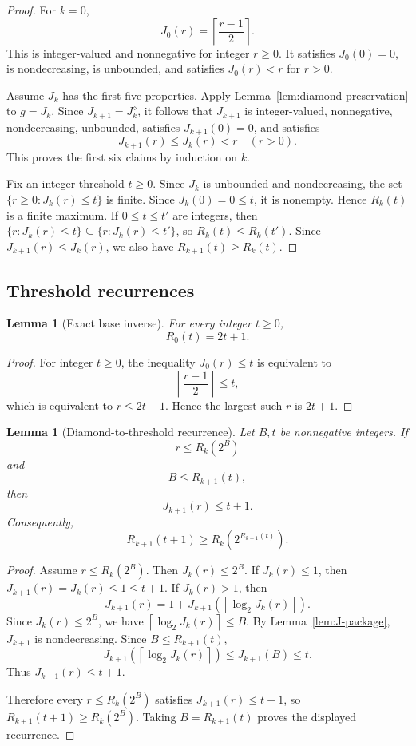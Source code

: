 ﻿\documentclass[11pt]{article}
\newtheorem{lemma}[theorem]{Lemma}
\newcommand{\ceil}[1]{\left\lceil #1 \right\rceil}
\begin{document}
\begin{proof}
For $k=0$,
\[
J_0(r)=\ceil{\frac{r-1}{2}}.
\]
This is integer-valued and nonnegative for integer $r\ge0$.  It satisfies $J_0(0)=0$, is nondecreasing, is unbounded, and satisfies $J_0(r)<r$ for $r>0$.

Assume $J_k$ has the first five properties.  Apply Lemma~\ref{lem:diamond-preservation} to $g=J_k$.  Since $J_{k+1}=J_k^\diamond$, it follows that $J_{k+1}$ is integer-valued, nonnegative, nondecreasing, unbounded, satisfies $J_{k+1}(0)=0$, and satisfies
\[
J_{k+1}(r)\le J_k(r)<r\quad(r>0).
\]
This proves the first six claims by induction on $k$.

Fix an integer threshold $t\ge0$.  Since $J_k$ is unbounded and nondecreasing, the set $\{r\ge0:J_k(r)\le t\}$ is finite.  Since $J_k(0)=0\le t$, it is nonempty.  Hence $R_k(t)$ is a finite maximum.  If $0\le t\le t'$ are integers, then $\{r:J_k(r)\le t\}\subseteq\{r:J_k(r)\le t'\}$, so $R_k(t)\le R_k(t')$.  Since $J_{k+1}(r)\le J_k(r)$, we also have $R_{k+1}(t)\ge R_k(t)$.
\end{proof}

\subsection{Threshold recurrences}

\begin{lemma}[Exact base inverse]\label{lem:R0}
For every integer $t\ge0$,
\[
R_0(t)=2t+1.
\]
\end{lemma}

\begin{proof}
For integer $t\ge0$, the inequality $J_0(r)\le t$ is equivalent to
\[
\ceil{\frac{r-1}{2}}\le t,
\]
which is equivalent to $r\le2t+1$.  Hence the largest such $r$ is $2t+1$.
\end{proof}

\begin{lemma}[Diamond-to-threshold recurrence]\label{lem:diamond-threshold}
Let $B,t$ be nonnegative integers.  If
\[
r\le R_k(2^B)
\]
and
\[
B\le R_{k+1}(t),
\]
then
\[
J_{k+1}(r)\le t+1.
\]
Consequently,
\[
R_{k+1}(t+1)\ge R_k(2^{R_{k+1}(t)}).
\]
\end{lemma}

\begin{proof}
Assume $r\le R_k(2^B)$.  Then $J_k(r)\le2^B$.  If $J_k(r)\le1$, then $J_{k+1}(r)=J_k(r)\le1\le t+1$.  If $J_k(r)>1$, then
\[
J_{k+1}(r)=1+J_{k+1}(\ceil{\log_2J_k(r)}).
\]
Since $J_k(r)\le2^B$, we have $\ceil{\log_2J_k(r)}\le B$.  By Lemma~\ref{lem:J-package}, $J_{k+1}$ is nondecreasing.  Since $B\le R_{k+1}(t)$,
\[
J_{k+1}(\ceil{\log_2J_k(r)})\le J_{k+1}(B)\le t.
\]
Thus $J_{k+1}(r)\le t+1$.

Therefore every $r\le R_k(2^B)$ satisfies $J_{k+1}(r)\le t+1$, so $R_{k+1}(t+1)\ge R_k(2^B)$.  Taking $B=R_{k+1}(t)$ proves the displayed recurrence.
\end{proof}
\end{document}
